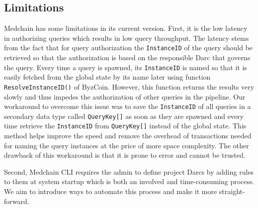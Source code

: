 
\subsection{Limitations}
Medchain has some limitations in its current version. First, it is the low latency in authorizing queries which results in low query throughput. The latency stems from the fact that for query authorization the \texttt{InstanceID} of the query should be retrieved so that the authorization is based on the responsible Darc that governs the query. Every time a query is spawned, its \texttt{InstanceID} is named so that it is easily fetched from the global state by its name later using function \texttt{ResolveInstanceID()} of ByzCoin. However, this function returns the results very slowly and thus impedes the authorization of other queries in the pipeline. 
Our workaround to overcome this issue was to save the \texttt{InstanceID} of all queries in a secondary data type called \texttt{QueryKey[]} as soon as they are spawned and every time retrieve the \texttt{InstanceID} from \texttt{QueryKey[]} instead of the global state. This method helps improve the speed and remove the overhead of transactions needed for naming the query instances at the price of more space complexity. The other drawback of this workaround is that it is prone to error and cannot be trusted. 

Second, Medchain CLI requires the admin to define project Darcs by adding rules to them at system startup which is both an involved and time-consuming process. We aim to introduce ways to automate this process and make it more straight-forward.  
